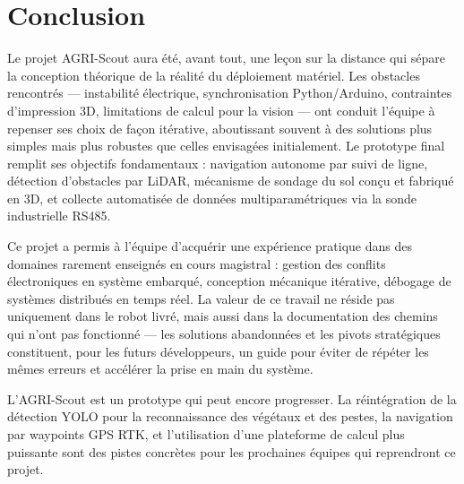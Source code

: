 \section{Conclusion}

Le projet AGRI-Scout aura été, avant tout, une leçon sur la distance qui sépare la conception théorique de la réalité du déploiement matériel. Les obstacles rencontrés --- instabilité électrique, synchronisation Python/Arduino, contraintes d'impression 3D, limitations de calcul pour la vision --- ont conduit l'équipe à repenser ses choix de façon itérative, aboutissant souvent à des solutions plus simples mais plus robustes que celles envisagées initialement. Le prototype final remplit ses objectifs fondamentaux : navigation autonome par suivi de ligne, détection d'obstacles par LiDAR, mécanisme de sondage du sol conçu et fabriqué en 3D, et collecte automatisée de données multiparamétriques via la sonde industrielle RS485.

Ce projet a permis à l'équipe d'acquérir une expérience pratique dans des domaines rarement enseignés en cours magistral : gestion des conflits électroniques en système embarqué, conception mécanique itérative, débogage de systèmes distribués en temps réel. La valeur de ce travail ne réside pas uniquement dans le robot livré, mais aussi dans la documentation des chemins qui n'ont pas fonctionné --- les solutions abandonnées et les pivots stratégiques constituent, pour les futurs développeurs, un guide pour éviter de répéter les mêmes erreurs et accélérer la prise en main du système.

L'AGRI-Scout est un prototype qui peut encore progresser. La réintégration de la détection YOLO pour la reconnaissance des végétaux et des pestes, la navigation par waypoints GPS RTK, et l'utilisation d'une plateforme de calcul plus puissante sont des pistes concrètes pour les prochaines équipes qui reprendront ce projet.
